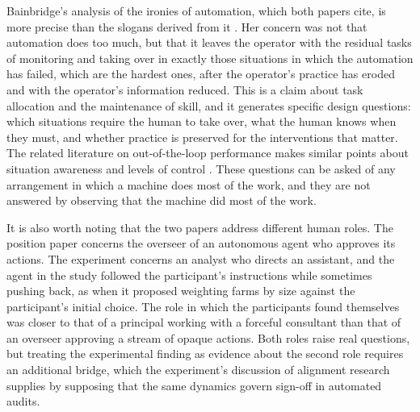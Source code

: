 \documentclass[11pt]{article}
\begin{document}
Bainbridge's analysis of the ironies of automation, which both papers cite, is more precise than the slogans derived from it \cite{bainbridge}. Her concern was not that automation does too much, but that it leaves the operator with the residual tasks of monitoring and taking over in exactly those situations in which the automation has failed, which are the hardest ones, after the operator's practice has eroded and with the operator's information reduced. This is a claim about task allocation and the maintenance of skill, and it generates specific design questions: which situations require the human to take over, what the human knows when they must, and whether practice is preserved for the interventions that matter. The related literature on out-of-the-loop performance makes similar points about situation awareness and levels of control \cite{endsley}. These questions can be asked of any arrangement in which a machine does most of the work, and they are not answered by observing that the machine did most of the work.

It is also worth noting that the two papers address different human roles. The position paper concerns the overseer of an autonomous agent who approves its actions. The experiment concerns an analyst who directs an assistant, and the agent in the study followed the participant's instructions while sometimes pushing back, as when it proposed weighting farms by size against the participant's initial choice. The role in which the participants found themselves was closer to that of a principal working with a forceful consultant than that of an overseer approving a stream of opaque actions. Both roles raise real questions, but treating the experimental finding as evidence about the second role requires an additional bridge, which the experiment's discussion of alignment research supplies by supposing that the same dynamics govern sign-off in automated audits.
\end{document}
